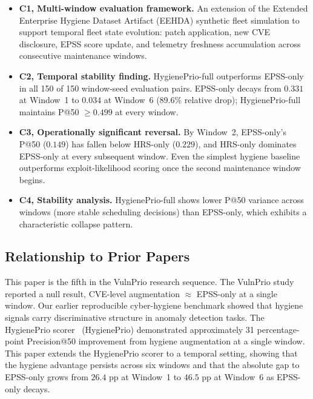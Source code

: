 \begin{itemize}
\item \textbf{C1, Multi-window evaluation framework.} An extension of the Extended Enterprise Hygiene Dataset Artifact (EEHDA) synthetic fleet simulation to support temporal fleet state evolution: patch application, new CVE disclosure, EPSS score update, and telemetry freshness accumulation across consecutive maintenance windows.

\item \textbf{C2, Temporal stability finding.} HygienePrio-full outperforms EPSS-only in all 150 of 150 window-seed evaluation pairs. EPSS-only decays from $0.331$ at Window~1 to $0.034$ at Window~6 (89.6\% relative drop); HygienePrio-full maintains P@50 $\geq 0.499$ at every window.

\item \textbf{C3, Operationally significant reversal.} By Window~2, EPSS-only's P@50 ($0.149$) has fallen below HRS-only ($0.229$), and HRS-only dominates EPSS-only at every subsequent window. Even the simplest hygiene baseline outperforms exploit-likelihood scoring once the second maintenance window begins.

\item \textbf{C4, Stability analysis.} HygienePrio-full shows lower P@50 variance across windows (more stable scheduling decisions) than EPSS-only, which exhibits a characteristic collapse pattern.
\end{itemize}

\subsection{Relationship to Prior Papers}

This paper is the fifth in the VulnPrio research sequence. The VulnPrio study~\cite{paper1vulnprio} reported a null result, CVE-level augmentation $\approx$ EPSS-only at a single window. Our earlier reproducible cyber-hygiene benchmark showed that hygiene signals carry discriminative structure in anomaly detection tasks. The HygienePrio scorer~\cite{paper4hygieneprio} (HygienePrio) demonstrated approximately 31 percentage-point Precision@50 improvement from hygiene augmentation at a single window. This paper extends the HygienePrio scorer to a temporal setting, showing that the hygiene advantage persists across six windows and that the absolute gap to EPSS-only grows from $26.4$ pp at Window~1 to $46.5$ pp at Window~6 as EPSS-only decays.
